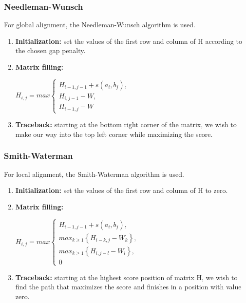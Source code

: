 \subsubsection{Needleman-Wunsch}

For global alignment, the Needleman-Wunsch \cite{needleman1970general} algorithm is used.

\begin{enumerate}
	\item \textbf{Initialization:} set the values of the first row and column of H according to the chosen gap penalty.
	
	\item \textbf{Matrix filling:}
		\begin{center}
			$H_{i,j} = max\begin{cases}H_{i-1,j-1} + s(a_{i},b_{j}), 
			\\  H_{i,j-1}- W,
			\\  H_{i-1,j}- W \end{cases}$
		\end{center}	
	
	\item \textbf{Traceback:} starting at the bottom right corner of the matrix, we wish to make our way into the top left corner while maximizing the score.
\end{enumerate}

\subsubsection{Smith-Waterman}

For local alignment, the Smith-Waterman \cite{smith1981identification} algorithm is used.

\begin{enumerate}
	\item \textbf{Initialization:} set the values of the first row and column of H to zero.
	
	\item \textbf{Matrix filling:} 
	
\begin{center}
	$ H_{i,j} = max\begin{cases}H_{i-1,j-1} + s(a_{i},b_{j}), 
	\\ max_{k\geq1} \left\{ H_{i-k,j}- W_{k} \right\},
	\\ max_{k\geq1} \left\{ H_{i,j-l}- W_{l} \right\},
	\\ 0\end{cases} $
\end{center}

	\item \textbf{Traceback:} starting at the highest score position of matrix H, we wish to find the path that maximizes the score and finishes in a position with value zero. 
\end{enumerate}


